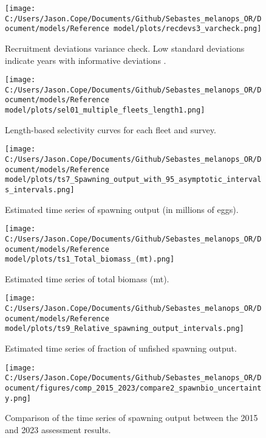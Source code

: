 \documentclass[11pt,
  english,
  letterpaper,
]{article}
\begin{document}
\begin{figure}
\centering
\texttt{[image: C:/Users/Jason.Cope/Documents/Github/Sebastes\_melanops\_OR/Document/models/Reference model/plots/recdevs3\_varcheck.png]}
\caption{Recruitment deviations variance check. Low standard deviations indicate years with informative deviations .\label{fig:varcheck}}
\end{figure}

\begin{figure}
\centering
\texttt{[image: C:/Users/Jason.Cope/Documents/Github/Sebastes\_melanops\_OR/Document/models/Reference model/plots/sel01\_multiple\_fleets\_length1.png]}
\caption{Length-based selectivity curves for each fleet and survey.\label{fig:fleet_selectivity}}
\end{figure}

\begin{figure}
\centering
\texttt{[image: C:/Users/Jason.Cope/Documents/Github/Sebastes\_melanops\_OR/Document/models/Reference model/plots/ts7\_Spawning\_output\_with\_95\_asymptotic\_intervals\_intervals.png]}
\caption{Estimated time series of spawning output (in millions of eggs).\label{fig:ssb}}
\end{figure}

\begin{figure}
\centering
\texttt{[image: C:/Users/Jason.Cope/Documents/Github/Sebastes\_melanops\_OR/Document/models/Reference model/plots/ts1\_Total\_biomass\_(mt).png]}
\caption{Estimated time series of total biomass (mt).\label{fig:tot-bio}}
\end{figure}

\begin{figure}
\centering
\texttt{[image: C:/Users/Jason.Cope/Documents/Github/Sebastes\_melanops\_OR/Document/models/Reference model/plots/ts9\_Relative\_spawning\_output\_intervals.png]}
\caption{Estimated time series of fraction of unfished spawning output.\label{fig:depl}}
\end{figure}

\begin{figure}
\centering
\texttt{[image: C:/Users/Jason.Cope/Documents/Github/Sebastes\_melanops\_OR/Document/figures/comp\_2015\_2023/compare2\_spawnbio\_uncertainty.png]}
\caption{Comparison of the time series of spawning output between the 2015 and 2023 assessment results.\label{fig:comp_ssb}}
\end{figure}
\end{document}
